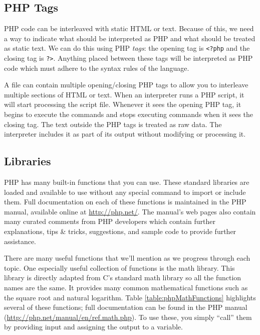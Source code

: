\subsection{PHP Tags}

PHP code can be interleaved with static HTML or text.  Because of this, 
we need a way to indicate what should be interpreted as PHP and what
should be treated as static text.  We can do this using PHP \emph{tags}: the
opening tag is \texttt{<?php} and the closing tag is \texttt{?>}.
Anything placed between these tags will be interpreted as PHP code which
must adhere to the syntax rules of the language.  

A file can contain multiple opening/closing PHP tags to allow you to
interleave multiple sections of HTML or text.  When an interpreter runs
a PHP script, it will start processing the script file.  Whenever it sees the
opening PHP tag, it begins to execute the commands and stops executing
commands when it sees the closing tag.  The text outside the PHP tags is
treated as raw data. The interpreter includes it as part of its output without
modifying or processing it.

\subsection{Libraries}

PHP has many built-in functions that you can use.  These standard
libraries are loaded and available to use without any special command
to import or include them.  Full documentation on each of these
functions is maintained in the PHP manual, available online at
\url{http://php.net/}.   The manual's web
pages also contain many curated comments from PHP developers
which contain further explanations, tips \& tricks, suggestions, and
sample code to provide further assistance.  

There are many useful functions that we'll mention as we progress
through each topic.  One especially useful collection of functions is 
the math library.  This library is directly adapted from C's standard 
math library so all the function names are the same.  It provides
many common mathematical functions such as the square root and 
natural logarithm.  Table \ref{table:phpMathFunctions} highlights several of 
these functions; full documentation can be found in the PHP manual 
(\url{http://php.net/manual/en/ref.math.php}).  To use these, you 
simply ``call'' them by providing input 
and assigning the output to a variable.

